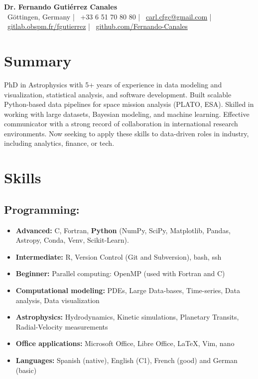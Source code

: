 \documentclass[11pt,a4paper]{article}
\begin{document}
\begin{center}
  {\Huge\bfseries Dr. Fernando Guti\'errez Canales}\\[8pt]
  \faMapMarker*~Göttingen, Germany \quad | \quad
  \faPhone~+33 6 51 70 80 80 \quad | \quad
  \faEnvelope~\href{mailto:carl.cfgc@gmail.com}{carl.cfgc@gmail.com} \quad | \quad
  \faGitlab~\href{https://gitlab.obspm.fr/fgutierrez}{gitlab.obspm.fr/fgutierrez} \quad | \quad
  \faGithub~\href{https://github.com/Fernando-Canales}{github.com/Fernando-Canales}
\end{center}
	
	\vspace{10pt}
	
	\begin{multicols}{2}
		
		\section{Summary}
		PhD in Astrophysics with 5+ years of experience in data modeling and visualization, statistical analysis, and software development. Built scalable Python-based data pipelines for space mission analysis (PLATO, ESA). Skilled in working with large datasets, Bayesian modeling, and machine learning. Effective communicator with a strong record of collaboration in international research environments. Now seeking to apply these skills to data-driven roles in industry, including analytics, finance, or tech.
		\section{Skills}
		
		\subsection{Programming:}
		\begin{itemize}
			\item \textbf{Advanced:} C, Fortran, \textbf{Python} (NumPy, SciPy, Matplotlib, Pandas, Astropy, Conda, Venv, Scikit-Learn). 
			\item \textbf{Intermediate:} R, Version Control (Git and Subversion), bash, ssh
			\item \textbf{Beginner:} Parallel computing: OpenMP (used with Fortran and C)
			\item \textbf{Computational modeling:} PDEs, Large Data-bases, Time-series, Data analysis, Data visualization
			\item \textbf{Astrophysics:} Hydrodynamics, Kinetic simulations, Planetary Transits, Radial-Velocity measurements 
			\item \textbf{Office applications:} Microsoft Office, Libre Office, \LaTeX , Vim, nano
			\item \textbf{Languages:} Spanish (native), English (C1), French (good) and German (basic)
		\end{itemize}
		

\end{multicols}
\end{document}
